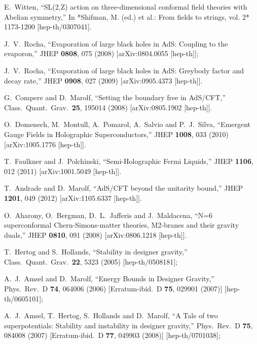 \documentclass[12pt]{article}
\begin{document}
\begin{thebibliography}{99}
  E.~Witten,
  ``SL(2,Z) action on three-dimensional conformal field theories with Abelian symmetry,''
  In *Shifman, M. (ed.) et al.: From fields to strings, vol. 2* 1173-1200
  [hep-th/0307041].

  J.~V.~Rocha,
  ``Evaporation of large black holes in AdS: Coupling to the evaporon,''
  JHEP {\bf 0808}, 075 (2008)
  [arXiv:0804.0055 [hep-th]];

 J.~V.~Rocha,
  ``Evaporation of large black holes in AdS: Greybody factor and decay rate,''
  JHEP {\bf 0908}, 027 (2009)
  [arXiv:0905.4373 [hep-th]].


  G.~Compere and D.~Marolf,
  ``Setting the boundary free in AdS/CFT,''
  Class.\ Quant.\ Grav.\  {\bf 25}, 195014 (2008)
  [arXiv:0805.1902 [hep-th]].

  O.~Domenech, M.~Montull, A.~Pomarol, A.~Salvio and P.~J.~Silva,
  ``Emergent Gauge Fields in Holographic Superconductors,''
  JHEP {\bf 1008}, 033 (2010)
  [arXiv:1005.1776 [hep-th]].

  T.~Faulkner and J.~Polchinski,
  ``Semi-Holographic Fermi Liquids,''
  JHEP {\bf 1106}, 012 (2011)
  [arXiv:1001.5049 [hep-th]].

  T.~Andrade and D.~Marolf,
  ``AdS/CFT beyond the unitarity bound,''
  JHEP {\bf 1201}, 049 (2012)
  [arXiv:1105.6337 [hep-th]].


  O.~Aharony, O.~Bergman, D.~L.~Jafferis and J.~Maldacena,
  ``N=6 superconformal Chern-Simons-matter theories, M2-branes and their gravity duals,''
  JHEP {\bf 0810}, 091 (2008)
  [arXiv:0806.1218 [hep-th]].

 T.~Hertog and S.~Hollands,
  ``Stability in designer gravity,''
  Class.\ Quant.\ Grav.\  {\bf 22}, 5323 (2005)
  [hep-th/0508181];

   A.~J.~Amsel and D.~Marolf,
  ``Energy Bounds in Designer Gravity,''
  Phys.\ Rev.\ D {\bf 74}, 064006 (2006)
  [Erratum-ibid.\ D {\bf 75}, 029901 (2007)]
  [hep-th/0605101];

    A.~J.~Amsel, T.~Hertog, S.~Hollands and D.~Marolf,
  ``A Tale of two superpotentials: Stability and instability in designer gravity,''
  Phys.\ Rev.\ D {\bf 75}, 084008 (2007)
  [Erratum-ibid.\ D {\bf 77}, 049903 (2008)]
  [hep-th/0701038];


\end{thebibliography}
\end{document}
